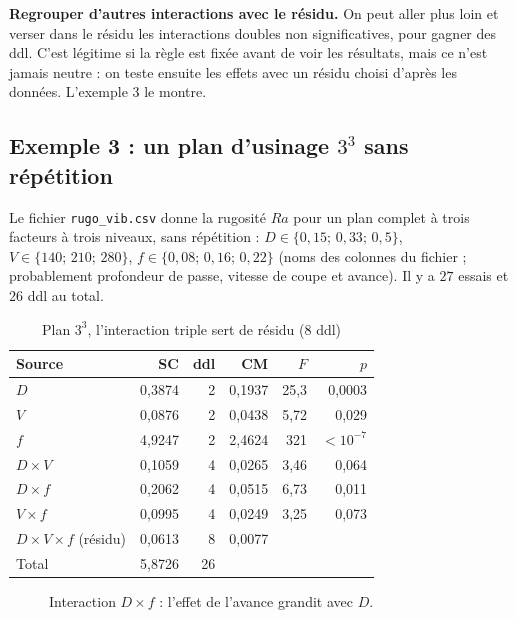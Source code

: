 \documentclass[11pt,a4paper]{article}
\theoremstyle{sj}
\theoremstyle{definition}
\theoremstyle{remark}
\begin{document}
\textbf{Regrouper d'autres interactions avec le résidu.} On peut aller plus loin et verser dans le résidu les interactions doubles non significatives, pour gagner des ddl. C'est légitime si la règle est fixée avant de voir les résultats, mais ce n'est jamais neutre : on teste ensuite les effets avec un résidu choisi d'après les données. L'exemple 3 le montre.

\subsection{Exemple 3 : un plan d'usinage $3^3$ sans répétition}

Le fichier \texttt{rugo\_vib.csv} donne la rugosité $Ra$ pour un plan complet à trois facteurs à trois niveaux, sans répétition : $D\in\{0{,}15;\,0{,}33;\,0{,}5\}$, $V\in\{140;\,210;\,280\}$, $f\in\{0{,}08;\,0{,}16;\,0{,}22\}$ (noms des colonnes du fichier ; probablement profondeur de passe, vitesse de coupe et avance). Il y a $27$ essais et $26$ ddl au total.

\begin{table}[h]
\centering
\caption{Plan $3^3$, l'interaction triple sert de résidu (8 ddl)}
\begin{tabular}{l r r r r r}
\toprule
Source & SC & ddl & CM & $F$ & $p$\\
\midrule
$D$ & 0,3874 & 2 & 0,1937 & 25,3 & 0,0003\\
$V$ & 0,0876 & 2 & 0,0438 & 5,72 & 0,029\\
$f$ & 4,9247 & 2 & 2,4624 & 321 & $<10^{-7}$\\
$D\times V$ & 0,1059 & 4 & 0,0265 & 3,46 & 0,064\\
$D\times f$ & 0,2062 & 4 & 0,0515 & 6,73 & 0,011\\
$V\times f$ & 0,0995 & 4 & 0,0249 & 3,25 & 0,073\\
$D\times V\times f$ (résidu) & 0,0613 & 8 & 0,0077 & &\\
\midrule
Total & 5,8726 & 26 & & &\\
\bottomrule
\end{tabular}
\end{table}

\begin{figure}[h]
\centering
{}
\caption{Interaction $D\times f$ : l'effet de l'avance grandit avec $D$.}
\end{figure}
\end{document}
